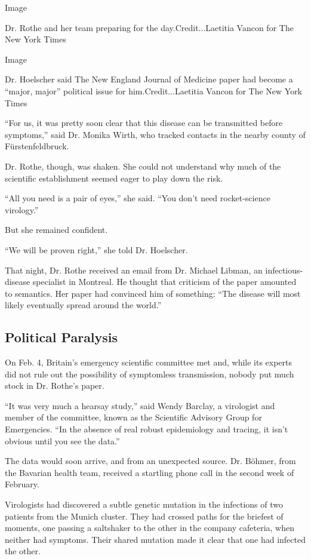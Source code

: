 Image

Dr. Rothe and her team preparing for the day.Credit...Laetitia Vancon
for The New York Times

Image

Dr. Hoelscher said The New England Journal of Medicine paper had become
a ``major, major'' political issue for him.Credit...Laetitia Vancon for
The New York Times

``For us, it was pretty soon clear that this disease can be transmitted
before symptoms,'' said Dr. Monika Wirth, who tracked contacts in the
nearby county of Fürstenfeldbruck.

Dr. Rothe, though, was shaken. She could not understand why much of the
scientific establishment seemed eager to play down the risk.

``All you need is a pair of eyes,'' she said. ``You don't need
rocket-science virology.''

But she remained confident.

``We will be proven right,'' she told Dr. Hoelscher.

That night, Dr. Rothe received an email from Dr. Michael Libman, an
infectious-disease specialist in Montreal. He thought that criticism of
the paper amounted to semantics. Her paper had convinced him of
something: ``The disease will most likely eventually spread around the
world.''

\hypertarget{political-paralysis}{%
\subsection{Political Paralysis}\label{political-paralysis}}

On Feb. 4, Britain's emergency scientific committee met and, while its
experts did not rule out the possibility of symptomless transmission,
nobody put much stock in Dr. Rothe's paper.

``It was very much a hearsay study,'' said Wendy Barclay, a virologist
and member of the committee, known as the Scientific Advisory Group for
Emergencies. ``In the absence of real robust epidemiology and tracing,
it isn't obvious until you see the data.''

The data would soon arrive, and from an unexpected source. Dr. Böhmer,
from the Bavarian health team, received a startling phone call in the
second week of February.

Virologists had discovered a subtle genetic mutation in the infections
of two patients from the Munich cluster. They had crossed paths for the
briefest of moments, one passing a saltshaker to the other in the
company cafeteria, when neither had symptoms. Their shared mutation made
it clear that one had infected the other.

